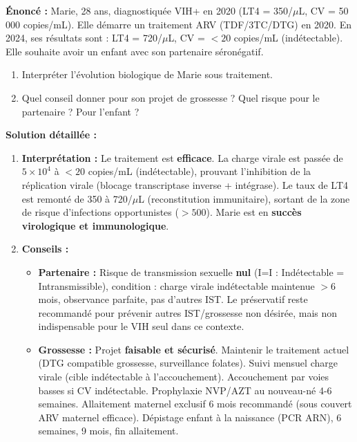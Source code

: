 \documentclass[11pt]{article}
\begin{document}
\begin{exoresolu}
\textbf{Énoncé :} Marie, 28 ans, diagnostiquée VIH+ en 2020 (LT4 = 350/$\mu$L, CV = 50 000 copies/mL). Elle démarre un traitement ARV (TDF/3TC/DTG) en 2020. En 2024, ses résultats sont : LT4 = 720/$\mu$L, CV = $< 20$ copies/mL (indétectable). Elle souhaite avoir un enfant avec son partenaire séronégatif.
\begin{enumerate}
    \item Interpréter l'évolution biologique de Marie sous traitement.
    \item Quel conseil donner pour son projet de grossesse ? Quel risque pour le partenaire ? Pour l'enfant ?
\end{enumerate}

\tcblower

\textbf{Solution détaillée :}
\begin{enumerate}
    \item \textbf{Interprétation :} Le traitement est \textbf{efficace}. La charge virale est passée de $5 \times 10^4$ à $< 20$ copies/mL (indétectable), prouvant l'inhibition de la réplication virale (blocage transcriptase inverse + intégrase). Le taux de LT4 est remonté de 350 à 720/$\mu$L (reconstitution immunitaire), sortant de la zone de risque d'infections opportunistes ($> 500$). Marie est en \textbf{succès virologique et immunologique}.
    \item \textbf{Conseils :}
    \begin{itemize}
        \item \textbf{Partenaire :} Risque de transmission sexuelle \textbf{nul} (I=I : Indétectable = Intransmissible), condition : charge virale indétectable maintenue $> 6$ mois, observance parfaite, pas d'autres IST. Le préservatif reste recommandé pour prévenir autres IST/grossesse non désirée, mais non indispensable pour le VIH seul dans ce contexte.
        \item \textbf{Grossesse :} Projet \textbf{faisable et sécurisé}. Maintenir le traitement actuel (DTG compatible grossesse, surveillance folates). Suivi mensuel charge virale (cible indétectable à l'accouchement). Accouchement par voies basses si CV indétectable. Prophylaxie NVP/AZT au nouveau-né 4-6 semaines. Allaitement maternel exclusif 6 mois recommandé (sous couvert ARV maternel efficace). Dépistage enfant à la naissance (PCR ARN), 6 semaines, 9 mois, fin allaitement.
    \end{itemize}
\end{enumerate}
\end{exoresolu}
\end{document}
